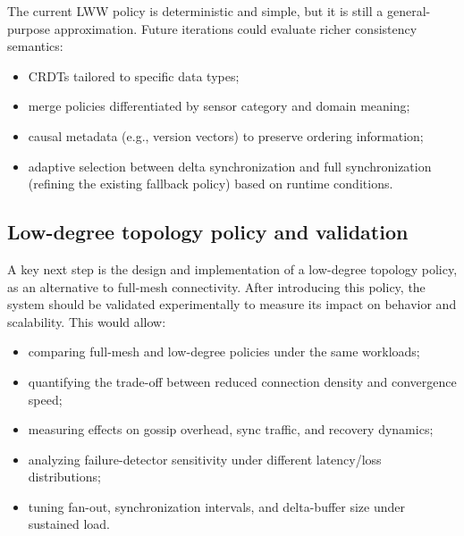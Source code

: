 The current LWW policy is deterministic and simple, but it is still a general-purpose approximation.
Future iterations could evaluate richer consistency semantics:
\begin{itemize}
  \item CRDTs tailored to specific data types;
  \item merge policies differentiated by sensor category and domain meaning;
  \item causal metadata (e.g., version vectors) to preserve ordering information;
  \item adaptive selection between delta synchronization and full synchronization (refining the existing fallback policy) based on runtime conditions.
\end{itemize}

\subsection{Low-degree topology policy and validation}

A key next step is the design and implementation of a low-degree topology policy, as an alternative to full-mesh connectivity.
After introducing this policy, the system should be validated experimentally to measure its impact on behavior and scalability.
This would allow:
\begin{itemize}
  \item comparing full-mesh and low-degree policies under the same workloads;
  \item quantifying the trade-off between reduced connection density and convergence speed;
  \item measuring effects on gossip overhead, sync traffic, and recovery dynamics;
  \item analyzing failure-detector sensitivity under different latency/loss distributions;
  \item tuning fan-out, synchronization intervals, and delta-buffer size under sustained load.
\end{itemize}

\clearpage
